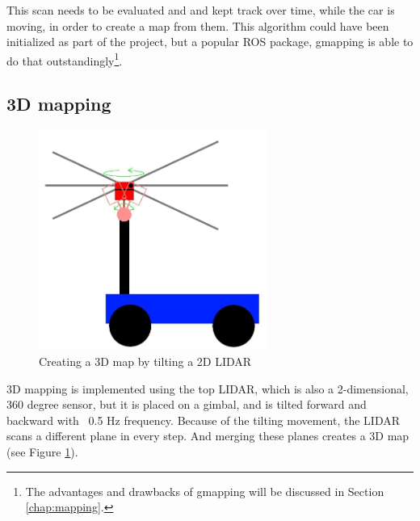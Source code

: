 This scan needs to be evaluated and and kept track over time, while the car is moving, in order to create a map from them. This algorithm could have been initialized as part of the project, but a popular ROS package, gmapping \cite{ros_gmapping} is able to do that outstandingly\footnote{The advantages and drawbacks of gmapping will be discussed in Section \ref{chap:mapping}.}.

\subsection{3D mapping}

\begin{figure}[!ht]
	\centering
	\includegraphics[height=72mm]{figures/raw/jpeg/3D_lidar.jpg}
	\caption{Creating a 3D map by tilting a 2D LIDAR}
	\label{tilt_lidar}
\end{figure}

3D mapping is implemented using the top LIDAR, which is also a 2-dimensional, 360 degree sensor, but it is placed on a gimbal, and is tilted forward and backward with ~0.5 Hz frequency. Because of the tilting movement, the LIDAR scans a different plane in every step. And merging these planes creates a 3D map (see Figure \ref{tilt_lidar}).

